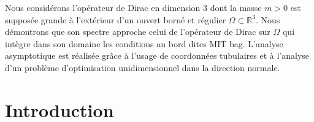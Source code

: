 \documentclass[JEP,XML,SOM,Unicode]{cedram}
\theoremstyle{plain}
\theoremstyle{definition}
\begin{document}


\begin{altabstract}
Nous considérons l'opérateur de Dirac en dimension $3$ dont la masse $m>0$ est supposée grande à l'extérieur d'un ouvert borné et régulier $\Omega\subset\mathbb{R}^3$. Nous démontrons que son spectre approche celui de l'opérateur de Dirac sur $\Omega$ qui intègre dans son domaine les conditions au bord dites \og MIT bag\fg. L'analyse asymptotique est réalisée grâce à l'usage de coordonnées tubulaires et à l'analyse d'un problème d'optimisation unidimensionnel dans la direction normale.
\end{altabstract}

\maketitle
\tableofcontents


\section{Introduction}
\end{document}
